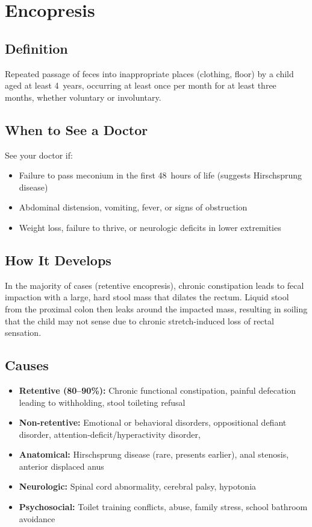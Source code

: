 \chapter{Encopresis}

\section*{Definition}
Repeated passage of feces into inappropriate places (clothing, floor) by a child aged at least 4~years, occurring at least once per month for at least three months, whether voluntary or involuntary.

\section*{When to See a Doctor}
See your doctor if:
\begin{itemize}
  \item Failure to pass meconium in the first 48~hours of life (suggests Hirschsprung disease)
  \item Abdominal distension, vomiting, fever, or signs of obstruction
  \item Weight loss, failure to thrive, or neurologic deficits in lower extremities
\end{itemize}

\section*{How It Develops}
In the majority of cases (retentive encopresis), chronic constipation leads to fecal impaction with a large, hard stool mass that dilates the rectum. Liquid stool from the proximal colon then leaks around the impacted mass, resulting in soiling that the child may not sense due to chronic stretch-induced loss of rectal sensation.

\section*{Causes}
\begin{itemize}
  \item \textbf{Retentive (80--90\%):} Chronic functional constipation, painful defecation leading to withholding, stool toileting refusal
  \item \textbf{Non-retentive:} Emotional or behavioral disorders, oppositional defiant disorder, attention-deficit/hyperactivity disorder,
  \item \textbf{Anatomical:} Hirschsprung disease (rare, presents earlier), anal stenosis, anterior displaced anus
  \item \textbf{Neurologic:} Spinal cord abnormality, cerebral palsy, hypotonia
  \item \textbf{Psychosocial:} Toilet training conflicts, abuse, family stress, school bathroom avoidance
\end{itemize}

